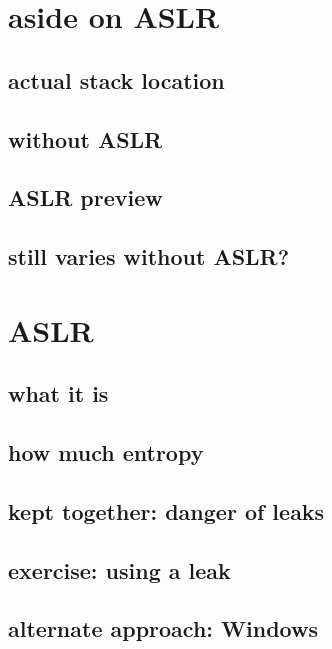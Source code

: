 
\section{aside on ASLR}
\subsection{actual stack location}


\subsection{without ASLR}


\subsection{ASLR preview}


\subsection{still varies without ASLR?}


\section{ASLR}
\subsection{what it is}


\subsection{how much entropy}


\subsection{kept together: danger of leaks}



\subsection{exercise: using a leak}



\subsection{alternate approach: Windows}


